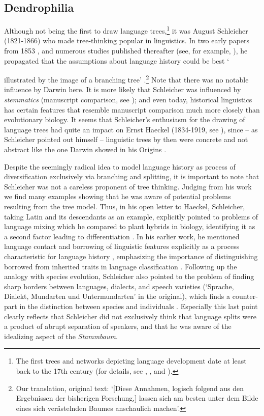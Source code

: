 \documentclass[svgnames,12pt]{scrartcl}
\begin{document}
\subsection{Dendrophilia}
Although not being the first to draw language trees,\footnote{The first trees and networks depicting
language development date at least back to the 17th century (for details, see \citealt{List2016h},
\citealt{Morrison2016}, and \citealt{Sutrop2012}).} it was August Schleicher (1821-1866) who made
tree-thinking popular in linguistics. In two early papers from 1853
\citep{Schleicher1853,Schleicher1853a}, and numerous studies published thereafter (see, for example,
\citealt{Schleicher1861,Schleicher1863}), he propagated that the assumptions about language history
could be best `{illustrated by the image of a branching tree'
\citep[787]{Schleicher1853}.\footnote{Our translation, original text: `[Diese Annahmen, logisch
folgend aus den Ergebnissen der bisherigen Forschung,] lassen sich am besten unter dem Bilde eines
sich verästelnden Baumes anschaulich machen'.} Note that there was no notable influence by Darwin
here. It is more likely that Schleicher was influenced by \emph{stemmatics} (manuscript comparison,
see \citealt[8]{Hoenigswald1963}); and even today, historical linguistics has certain features that
resemble manuscript comparison much more closely than evolutionary biology. It seems that
Schleicher's enthusiasm for the drawing of language trees had quite an impact on Ernst Haeckel
(1834-1919, see \citealt{Sutrop2012}), since – as Schleicher pointed out himself
\citep[14]{Schleicher1863} – linguistic trees by then were concrete and not abstract like the one
Darwin showed in his Origins \citep{Darwin1859}.
 
Despite the seemingly radical idea to model language history as process of diversification
exclusively via branching and splitting, it is important to note that Schleicher was not a careless
proponent of tree thinking. Judging from his work we find many examples showing that he was aware of
potential problems resulting from the tree model. Thus, in his open letter to Haeckel, Schleicher,
taking Latin and its descendants as an example, explicitly pointed to problems of language mixing
which he compared to plant hybrids in biology, identifying it as a second factor leading to
differentiation \citep[18]{Schleicher1863}. 
In his earlier work, he mentioned language contact and
borrowing of linguistic features explicitly as a process characteristic for language history \citep[6]{Schleicher1861}, emphasizing the importance of
distinguishing borrowed from inherited traits in language classification \citep[30]{Schleicher1848}.
Following up the analogy with species evolution, Schleicher also pointed to the problem of finding
sharp borders between languages, dialects, and speech varieties (`Sprache, Dialekt, Mundarten und
Untermundarten' in the original), which finds a counter-part in the distinction between species and
individuals \citep[21]{Schleicher1863}. Especially this last point clearly reflects
that Schleicher did not exclusively think that
language splits were a product of abrupt separation of speakers, and that he was aware of the
idealizing aspect of the \emph{Stammbaum}.
}
\end{document}
